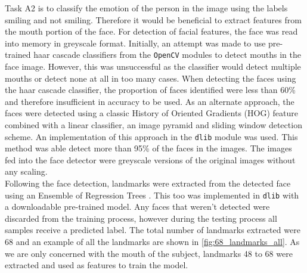 \documentclass{article}
\begin{document}
 		Task A2 is to classify the emotion of the person in the image using the labels smiling and not smiling. Therefore it would be beneficial to extract features from the mouth portion of the face. For detection of facial features, the face was read into memory in greyscale format. Initially, an attempt was made to use pre-trained haar cascade classifiers from the {\tt OpenCV} modules to detect mouths in the face image. However, this was unsuccessful as the classifier would detect multiple mouths or detect none at all in too many cases. When detecting the faces using the haar cascade classifier, the proportion of faces identified were less than 60\% and therefore insufficient in accuracy to be used. As an alternate approach, the faces were detected using a classic History of Oriented Gradients (HOG) feature combined with a linear classifier, an image pyramid and sliding window detection scheme. An implementation of this approach in the {\tt dlib} module was used. This method was able detect more than 95\% of the faces in the images. The images fed into the face detector were greyscale versions of the original images without any scaling.
 		\\
 		
 		Following the face detection, landmarks were extracted from the detected face using an Ensemble of Regression Trees \autocite{6909637}. This too was implemented in {\tt dlib} with a downloadable pre-trained model. Any faces that weren't detected were discarded from the training process, however during the testing process all samples receive a predicted label. The total number of landmarks extracted were 68 and an example of all the landmarks are shown in \ref{fig:68_landmarks_all}. As we are only concerned with the mouth of the subject, landmarks 48 to 68 were extracted and used as features to train the model.
 		\\
 		
\end{document}
